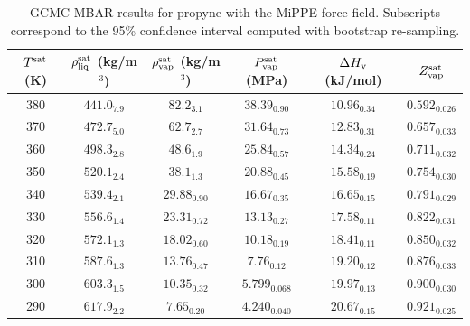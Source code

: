 \documentclass[journal=jctc,manuscript=article]{achemso}
\begin{document}
\begin{table}[htb!]
	\caption{GCMC-MBAR results for propyne with the MiPPE force field. Subscripts correspond to the 95\% confidence interval computed with bootstrap re-sampling.}
	\begin{center}
		\begin{tabular}{|c|c|c|c|c|c|}
			\hline
			$T^{\rm sat}$ (K) & $\rho_{\rm liq}^{\rm sat}$ (kg/m$^3$) & $\rho_{\rm vap}^{\rm sat}$ (kg/m$^3$) & $P_{\rm vap}^{\rm sat}$ (MPa) & $\Delta H_{\rm v}$ (kJ/mol) & $Z_{\rm vap}^{\rm sat}$ \\ \hline
            380 & $441.0_{7.9}$ & $82.2_{3.1}$ & $38.39_{0.90}$ & $10.96_{0.34}$ & $0.592_{0.026}$ \\
            370 & $472.7_{5.0}$ & $62.7_{2.7}$ & $31.64_{0.73}$ & $12.83_{0.31}$ & $0.657_{0.033}$ \\
            360 & $498.3_{2.8}$ & $48.6_{1.9}$ & $25.84_{0.57}$ & $14.34_{0.24}$ & $0.711_{0.032}$ \\
            350 & $520.1_{2.4}$ & $38.1_{1.3}$ & $20.88_{0.45}$ & $15.58_{0.19}$ & $0.754_{0.030}$ \\
            340 & $539.4_{2.1}$ & $29.88_{0.90}$ & $16.67_{0.35}$ & $16.65_{0.15}$ & $0.791_{0.029}$ \\
            330 & $556.6_{1.4}$ & $23.31_{0.72}$ & $13.13_{0.27}$ & $17.58_{0.11}$ & $0.822_{0.031}$ \\
            320 & $572.1_{1.3}$ & $18.02_{0.60}$ & $10.18_{0.19}$ & $18.41_{0.11}$ & $0.850_{0.032}$ \\
            310 & $587.6_{1.3}$ & $13.76_{0.47}$ & $7.76_{0.12}$ & $19.20_{0.12}$ & $0.876_{0.033}$ \\
            300 & $603.3_{1.5}$ & $10.35_{0.32}$ & $5.799_{0.068}$ & $19.97_{0.13}$ & $0.900_{0.030}$ \\
            290 & $617.9_{2.2}$ & $7.65_{0.20}$ & $4.240_{0.040}$ & $20.67_{0.15}$ & $0.921_{0.025}$ \\
			\hline
		\end{tabular}
	\end{center}
\end{table}
\end{document}
